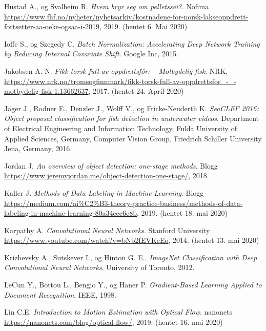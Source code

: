 \documentclass[11ot]{article}
\begin{document}
\begin{thebibliography}{9}
Hustad A., og Svalheim R.
\textit{Hvem bryr seg om pelletssei?}. 
Nofima \url{https://www.fhf.no/nyheter/nyhetsarkiv/kostnadene-for-norsk-lakseoppdrett-fortsetter-aa-oeke-ogsaa-i-2019}, 2019. (hentet 6. Mai 2020)

Ioffe S., og Szegedy C. 
\textit{Batch Normalization: Accelerating Deep Network Training by Reducing Internal Covariate Shift}. 
Google Inc, 2015.

Jakobsen A. N.
\textit{Fikk torsk full av oppdrettsfôr: – Motbydelig fisk}. 
NRK, \url{https://www.nrk.no/tromsogfinnmark/fikk-torsk-full-av-oppdrettsfor_-_-motbydelig-fisk-1.13662637}, 2017. (hentet 24. April 2020)

Jäger J., Rodner E., Denzler J., Wolff V., og Fricke-Neuderth K. 
\textit{SeaCLEF 2016: Object proposal classification for fish detection in underwater videos}. 
Department of Electrical Engineering and Information Technology, Fulda University of Applied Sciences, Germany, Computer Vision Group, Friedrich Schiller University Jena, Germany, 2016.


Jordan J.
\textit{An overview of object detection: one-stage methods}. 
Blogg \url{https://www.jeremyjordan.me/object-detection-one-stage/}, 2018.

Kaller J. 
\textit{Methods of Data Labeling in Machine Learning}. 
Blogg \url{https://medium.com/ai%C2%B3-theory-practice-business/methods-of-data-labeling-in-machine-learning-80a34ece6c8b}, 2019. (hentet 18. mai 2020)

Karpathy A. 
\textit{Convolutional Neural Networks}. 
Stanford University \url{https://www.youtube.com/watch?v=bNb2fEVKeEo}, 2014. (hentet 13. mai 2020)

Krizhevsky A., Sutskever  I., og Hinton G. E.. 
\textit{ImageNet Classification with Deep Convolutional Neural Networks}. 
University of Toronto, 2012.

LeCun Y., Bottou L., Bengio Y., og Haner P. 
\textit{Gradient-Based Learning Applied to Document Recognition}. 
IEEE, 1998.

Lin C.E. 
\textit{Introduction to Motion Estimation with Optical Flow}. 
nanonets \url{https://nanonets.com/blog/optical-flow/}, 2019. (hentet 16. mai 2020)


\end{thebibliography}
\end{document}
